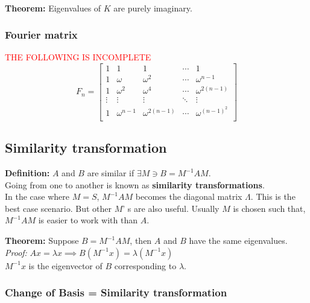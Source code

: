 \vspace{6pt}

\\

\textbf{Theorem:} Eigenvalues of $K$ are purely imaginary.\\

\subsubsection{Fourier matrix}
\textcolor{red}{THE FOLLOWING IS INCOMPLETE}\\


$$F_n =
\begin{bmatrix}
1 & 1 & 1 & \cdots & 1\\
1 & \omega & \omega^2 & \cdots & \omega^{n-1}\\
1 & \omega^2 & \omega^4 & \cdots & \omega^{2(n-1)}\\
\vdots & \vdots & \vdots & \ddots & \vdots \\
1 & \omega^{n-1} & \omega^{2(n-1)} & \cdots & \omega^{(n-1)^2}\\
\end{bmatrix}
$$


\subsection{Similarity transformation}
\textbf{Definition:} $A$ and $B$ are similar if $\exists M \ni B= M^{-1}AM$.\\
Going from one to another is known as \textbf{similarity transformations}.\\

\vspace{6pt}
In the case where $M = S$, $M^{-1}AM$ becomes the diagonal matrix $\Lambda$. This is the best case scenario. But other $M$'
s are also useful. Usually $M$ is chosen such that, $M^{-1}AM$ is easier to work with than $A$.
\vspace{6pt}

\textbf{Theorem:} Suppose $B = M^{-1}AM$, then $A$ and $B$ have the same eigenvalues.\\
\textit{Proof:} $Ax = \lambda x \implies B(M^{-1}x) = \lambda (M^{-1}x)$\\
$M^{-1}x$ is the eigenvector of $B$ corresponding to $\lambda$.
\vspace{6pt}

\subsubsection{Change of Basis = Similarity transformation}


